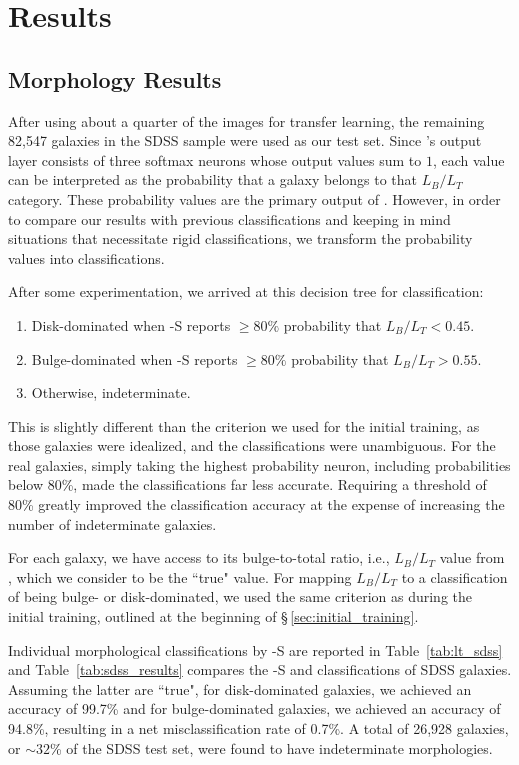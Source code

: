 \section{Results} \label{sec:results}
\subsection{Morphology Results}\label{sec:morph_results}
After using about a quarter of the images for transfer learning, the remaining 82,547 galaxies in the SDSS sample were used as our test set. Since \gamornet{}'s output layer consists of three softmax neurons whose output values sum to $1$, each value can be interpreted as the probability that a galaxy belongs to that $L_B/L_T$ category. These probability values are the primary output of \gamornet{}. However, in order to compare our results with previous classifications and keeping in mind situations that necessitate rigid classifications, we transform the probability values into classifications.

After some experimentation, we arrived at this decision tree for classification:
\begin{enumerate}[noitemsep]
\item Disk-dominated when \gamornet{}-S reports $\geq 80\%$ probability that $L_B/L_T < 0.45$.
\item Bulge-dominated when \gamornet{}-S reports $\geq 80\%$ probability that $L_B/L_T > 0.55$.
\item Otherwise, indeterminate.
\end{enumerate}
This is slightly different than the criterion we used for the initial training, as those galaxies were idealized, and the classifications were unambiguous. For the real galaxies, simply taking the highest probability neuron, including probabilities below 80\%, made the classifications far less accurate. Requiring a threshold of 80\% greatly improved the classification accuracy at the expense of increasing the number of indeterminate galaxies.


For each galaxy, we have access to its bulge-to-total ratio, i.e., $L_B/L_T$ value from \citet{simard_11}, which we consider to be the ``true" value. For mapping $L_B/L_T$ to a classification of being bulge- or disk-dominated, we used the same criterion as during the initial training, outlined at the beginning of \S\,\ref{sec:initial_training}.

Individual morphological classifications by \gamornet{}-S are reported in Table~\ref{tab:lt_sdss} and Table~\ref{tab:sdss_results} compares the \gamornet{}-S and \citet{simard_11} classifications of SDSS galaxies. Assuming the latter are ``true", for disk-dominated galaxies, we achieved an accuracy of 99.7\% and for bulge-dominated galaxies, we achieved an accuracy of 94.8\%, resulting in a net misclassification rate of 0.7\%. A total of 26,928 galaxies, or $\sim 32$\% of the SDSS test set, were found to have indeterminate morphologies.

